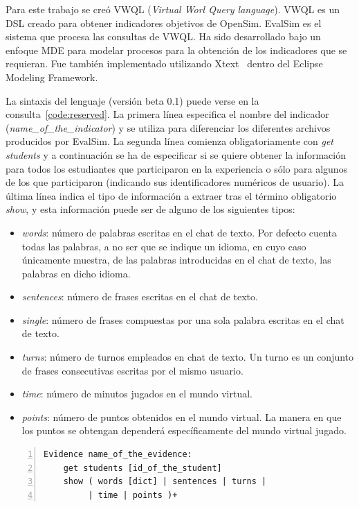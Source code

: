 			Para este trabajo se creó VWQL (\emph{Virtual Worl Query language}). VWQL es un DSL creado para obtener indicadores objetivos de OpenSim. EvalSim es el sistema que procesa las consultas de VWQL. Ha sido desarrollado bajo un enfoque MDE para modelar procesos para la obtención de los indicadores que se requieran. Fue también implementado utilizando Xtext~\cite{eysholdt2010xtext} dentro del Eclipse Modeling Framework.

			La sintaxis del lenguaje (versión beta 0.1) puede verse en la consulta~\ref{code:reserved}. La primera línea especifica el nombre del indicador (\emph{name\_of\_the\_indicator}) y se utiliza para diferenciar los diferentes archivos producidos por EvalSim. La segunda línea comienza obligatoriamente con \emph{get students} y a continuación se ha de especificar si se quiere obtener la información para todos los estudiantes que participaron en la experiencia o sólo para algunos de los que participaron (indicando sus identificadores numéricos de usuario). La última línea indica el tipo de información a extraer tras el término obligatorio \emph{show}, y esta información puede ser de alguno de los siguientes tipos:

\begin{itemize}
\item \emph{words}: número de palabras escritas en el chat de texto. Por defecto cuenta todas las palabras, a no ser que se indique un idioma, en cuyo caso únicamente muestra, de las palabras introducidas en el chat de texto, las palabras en dicho idioma.
\item \emph{sentences}: número de frases escritas en el chat de texto.
\item \emph{single}: número de frases compuestas por una sola palabra escritas en el chat de texto.
\item \emph{turns}: número de turnos empleados en chat de texto. Un turno es un conjunto de frases consecutivas escritas por el mismo usuario.
\item \emph{time}: número de minutos jugados en el mundo virtual.
\item \emph{points}: número de puntos obtenidos en el mundo virtual. La manera en que los puntos se obtengan dependerá específicamente del mundo virtual jugado.
\end{itemize}

\begin{center}
\begin{lstlisting}[caption=Palabras reservadas y formato de VWQL (version 0.1), label=code:reserved,numbers=left, captionpos=b, morekeywords={Evidence,get, students, show, words, sentences, turns, time, points}]
Evidence name_of_the_evidence:
    get students [id_of_the_student]
    show ( words [dict] | sentences | turns |
         | time | points )+
\end{lstlisting}
\end{center}

